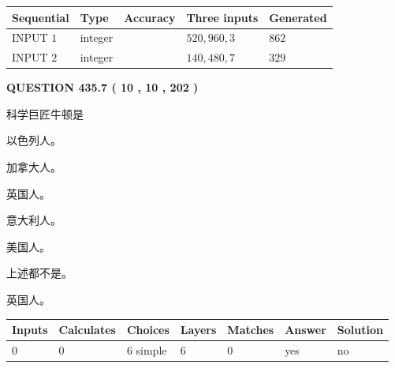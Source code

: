 \documentclass{ctexart}
\begin{document}
   
  
  
\noindent\begin{tabular}{|l|l|l|l|l|}
\hline
 Sequential & Type & Accuracy & Three inputs & Generated \\ 
\hline
 
 
  INPUT $  1 $ & integer &  & $
 520
 , 
 960
 , 
 3
 $ & $ 862 $ 
 \\  \hline  
 
 
  INPUT $  2 $ & integer &  & $
 140
 , 
 480
 , 
 7
 $ & $ 329 $ 
 \\  \hline  
 \end{tabular}
   
   
  
\vspace{0.2in}
  
{\textbf{\Large{QUESTION
435.7 
 ( 10 , 10 , 202 )
}}}
  
  
科学巨匠牛顿是
 
 
以色列人。
 
 
加拿大人。
 
 
英国人。
 
 
意大利人。
 
 
美国人。
 
 
 上述都不是。
 
 
\noindent{}
 
 
英国人。
 
 
\noindent{}
 
 
   
   
   
   
\noindent\begin{tabular}{|l|l|l|l|l|l|l|}
 \hline
Inputs & Calculates & Choices & Layers & Matches & Answer & Solution \\ \hline
 0  & 
 0  & 
 6
  simple  
  & 
 6  & 
 0  & 
  yes & 
  no 
  \\ \hline
 \end{tabular}
   
   
   
   
\noindent{}
   
\end{document}
